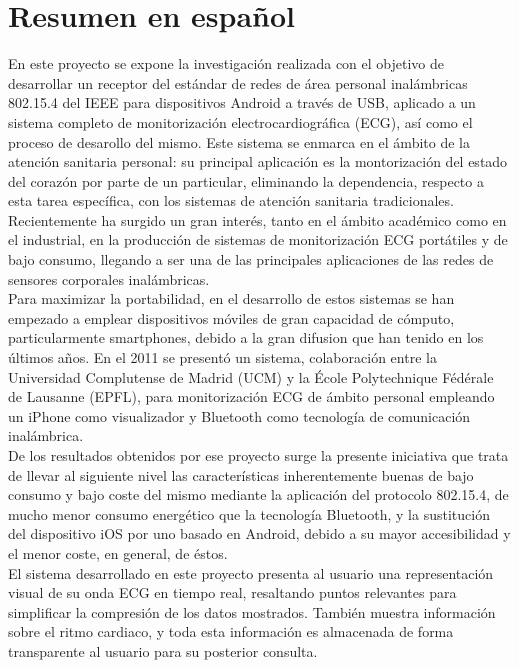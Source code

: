 \chapter{Resumen en español}
\label{ch:resumen}

	En este proyecto se expone la investigación realizada con el objetivo de desarrollar un receptor del estándar de redes de área personal inalámbricas 802.15.4 del IEEE para dispositivos Android a través de USB, aplicado a un sistema completo de monitorización electrocardiográfica (ECG), así como el proceso de desarollo del mismo. Este sistema se enmarca en el ámbito de la atención sanitaria personal: su principal aplicación es la montorización del estado del corazón por parte de un particular, eliminando la dependencia, respecto a esta tarea específica, con los sistemas de atención sanitaria tradicionales.\\

	Recientemente ha surgido un gran interés, tanto en el ámbito académico como en el industrial, en la producción de sistemas de monitorización ECG portátiles y de bajo consumo, llegando a ser una de las principales aplicaciones de las redes de sensores corporales inalámbricas.\\

	Para maximizar la portabilidad, en el desarrollo de estos sistemas se han empezado a emplear dispositivos móviles de gran capacidad de cómputo, particularmente smartphones, debido a la gran difusion que han tenido en los últimos años. En el 2011  se presentó un sistema, colaboración entre la Universidad Complutense de Madrid (UCM) y la École Polytechnique Fédérale de Lausanne (EPFL), para monitorización ECG de ámbito personal empleando un iPhone como visualizador y Bluetooth como tecnología de comunicación inalámbrica.\\

	De los resultados obtenidos por ese proyecto surge la presente iniciativa que trata de llevar al siguiente nivel las características inherentemente buenas de bajo consumo y bajo coste del mismo mediante la aplicación del protocolo 802.15.4, de mucho menor consumo energético que la tecnología Bluetooth, y la sustitución del dispositivo iOS por uno basado en Android, debido a su mayor accesibilidad y el menor coste, en general, de éstos.\\

	El sistema desarrollado en este proyecto presenta al usuario una representación visual de su onda ECG en tiempo real, resaltando puntos relevantes para simplificar la compresión de los datos mostrados. También muestra información sobre el ritmo cardiaco, y toda esta información es almacenada de forma transparente al usuario para su posterior consulta.\\

